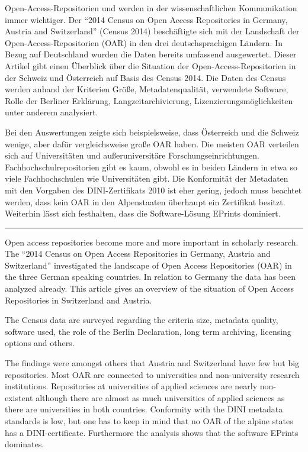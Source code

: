\small
Open-Access-Repositorien und werden in der wissenschaftlichen
Kommunikation immer wichtiger. Der ``2014 Census on Open Access
Repositories in Germany, Austria and Switzerland'' (Census 2014)
beschäftigte sich mit der Landschaft der Open-Access-Repositorien (OAR)
in den drei deutschsprachigen Ländern. In Bezug auf Deutschland wurden
die Daten bereits umfassend ausgewertet. Dieser Artikel gibt einen
Überblick über die Situation der Open-Access-Repositorien in der Schweiz
und Österreich auf Basis des Census 2014. Die Daten des Census werden
anhand der Kriterien Größe, Metadatenqualität, verwendete Software,
Rolle der Berliner Erklärung, Langzeitarchivierung,
Lizenzierungsmöglichkeiten unter anderem analysiert.

Bei den Auswertungen zeigte sich beispielsweise, dass Österreich und die
Schweiz wenige, aber dafür vergleichsweise große OAR haben. Die meisten
OAR verteilen sich auf Universitäten und außeruniversitäre
Forschungseinrichtungen. Fachhochschulrepositorien gibt es kaum, obwohl
es in beiden Ländern in etwa so viele Fachhochschulen wie Universitäten
gibt. Die Konformität der Metadaten mit den Vorgaben des
DINI-Zertifikats 2010 ist eher gering, jedoch muss beachtet werden, dass
kein OAR in den Alpenstaaten überhaupt ein Zertifikat besitzt. Weiterhin
lässt sich festhalten, dass die Software-Lösung EPrints dominiert.

\begin{center}\rule{0.5\linewidth}{\linethickness}\end{center}

Open access repositories become more and more important in scholarly
research. The ``2014 Census on Open Access Repositories in Germany,
Austria and Switzerland'' investigated the landscape of Open Access
Repositories (OAR) in the three German speaking countries. In relation
to Germany the data has been analyzed already. This article gives an
overview of the situation of Open Access Repositories in Switzerland and
Austria.

The Census data are surveyed regarding the criteria size, metadata
quality, software used, the role of the Berlin Declaration, long term
archiving, licensing options and others.

The findings were amongst others that Austria and Switzerland have few
but big repositories. Most OAR are connected to universities and
non-university research institutions. Repositories at universities of
applied sciences are nearly non-existent although there are almost as
much universities of applied sciences as there are universities in both
countries. Conformity with the DINI metadata standards is low, but one
has to keep in mind that no OAR of the alpine states has a
DINI-certificate. Furthermore the analysis shows that the software
EPrints dominates.
